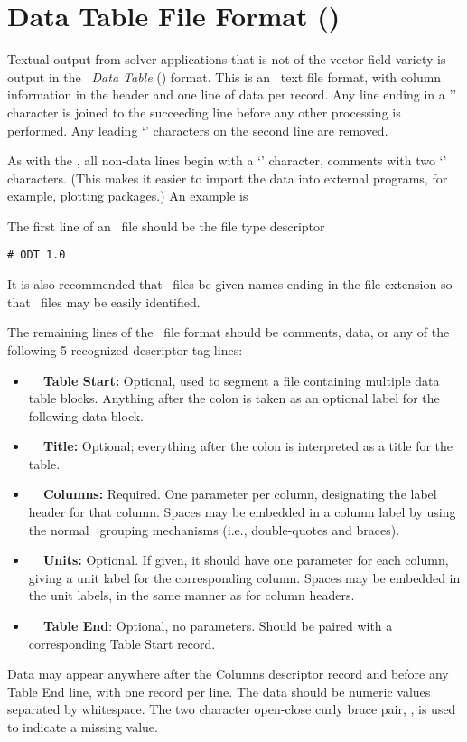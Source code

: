 \chapter{Data Table File Format (\ODT)}\label{sec:odtformat}

Textual output from solver applications that is not of the vector field
variety is output in the {\em \OOMMF\ Data Table} (\ODT)
format.  This is an \ASCII\ text file format,
with column information in the header and one line of data per record.
Any line ending in a '\bs' character is joined to the succeeding
line before any other processing is performed.  Any leading `\lb'
characters on the second line are removed.

As with the , all non-data lines begin with a `\lb'
character, comments with two `\lb' characters.  (This makes it easier
to import the data into external programs, for example, plotting
packages.)  An example is 

The first line of an \ODT\ file should be the file type descriptor
\begin{verbatim}
# ODT 1.0
\end{verbatim}
It is also recommended that \ODT\ files be given names ending
in the file extension  so that \ODT\ files may be
easily identified.

The remaining lines of the \ODT\ file format should be comments,
data, or any of the following 5 recognized descriptor tag lines:
\begin{itemize}
\item {\bf\ \lb\ Table Start:} Optional, used to segment a file
   containing multiple data table blocks.  Anything after the colon is
   taken as an optional label for the following data block.
\item {\bf\ \lb\ Title:} Optional; everything after the colon is
   interpreted as a title for the table.
\item {\bf\ \lb\ Columns:} Required.  One parameter per column,
   designating the label header for that column.  Spaces may be embedded
   in a column label by using the normal \Tcl\ grouping mechanisms
   (i.e., double-quotes and braces).
\item {\bf\ \lb\ Units:} Optional.  If given, it should have one
   parameter for each column, giving a unit label for the
   corresponding column.  Spaces may be embedded in the unit labels, in
   the same manner as for column headers.
\item {\bf\ \lb\ Table End}: Optional, no parameters.  Should be paired
   with a corresponding Table Start record.
\end{itemize}
Data may appear anywhere after the Columns descriptor record
and before any Table End line, with one record per line.
The data should be numeric values separated by whitespace.  The two
character open-close curly brace pair, \ocb\ccb, is used to indicate
a missing value.


